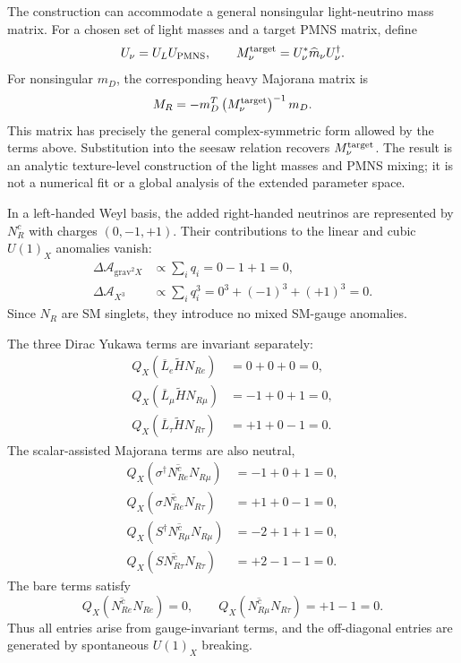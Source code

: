 \documentclass[12pt,a4paper]{article}
\begin{document}
The construction can accommodate a general nonsingular light-neutrino mass matrix. For a chosen set of light masses and a target PMNS matrix, define
\[
U_\nu=U_LU_{\rm PMNS},\qquad
M_\nu^{\rm target}=U_\nu^*\widehat m_\nu U_\nu^\dagger.
\]
For nonsingular \(m_D\), the corresponding heavy Majorana matrix is
\begin{equation}\label{eq:reply-neutrino-reconstruction}
M_R=-m_D^T\left(M_\nu^{\rm target}\right)^{-1}m_D.
\end{equation}
This matrix has precisely the general complex-symmetric form allowed by the terms above. Substitution into the seesaw relation recovers \(M_\nu^{\rm target}\). The result is an analytic texture-level construction of the light masses and PMNS mixing; it is not a numerical fit or a global analysis of the extended parameter space.

In a left-handed Weyl basis, the added right-handed neutrinos are represented by \(N_R^c\) with charges \((0,-1,+1)\). Their contributions to the linear and cubic \(U(1)_X\) anomalies vanish:
\[
\begin{aligned}
\Delta\mathcal A_{\mathrm{grav}^2X}
&\propto\sum_i q_i=0-1+1=0,\\
\Delta\mathcal A_{X^3}
&\propto\sum_i q_i^3=0^3+(-1)^3+(+1)^3=0.
\end{aligned}
\]
Since \(N_R\) are SM singlets, they introduce no mixed SM-gauge anomalies.

The three Dirac Yukawa terms are invariant separately:
\[
\begin{aligned}
Q_X(\overline L_e\widetilde H N_{Re})&=0+0+0=0,\\
Q_X(\overline L_\mu\widetilde H N_{R\mu})&=-1+0+1=0,\\
Q_X(\overline L_\tau\widetilde H N_{R\tau})&=+1+0-1=0.
\end{aligned}
\]
The scalar-assisted Majorana terms are also neutral,
\[
\begin{aligned}
Q_X(\sigma^\dagger\overline{N_{Re}^{c}}N_{R\mu})
&=-1+0+1=0,\\
Q_X(\sigma\overline{N_{Re}^{c}}N_{R\tau})
&=+1+0-1=0,\\
Q_X(S^\dagger\overline{N_{R\mu}^{c}}N_{R\mu})
&=-2+1+1=0,\\
Q_X(S\overline{N_{R\tau}^{c}}N_{R\tau})
&=+2-1-1=0.
\end{aligned}
\]
The bare terms satisfy
\[
Q_X(\overline{N_{Re}^{c}}N_{Re})=0,\qquad
Q_X(\overline{N_{R\mu}^{c}}N_{R\tau})=+1-1=0.
\]
Thus all entries arise from gauge-invariant terms, and the off-diagonal entries are generated by spontaneous \(U(1)_X\) breaking.
\end{document}
